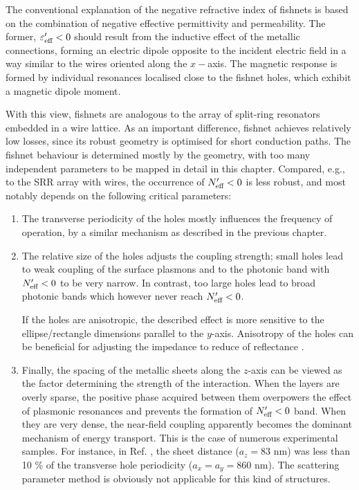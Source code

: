 The conventional explanation of the negative refractive index of fishnets is based on the combination of negative effective permittivity and permeability. The former, $\varepsilon_{\text{eff} }'<0$ should result from the inductive effect of the metallic connections, forming an electric dipole opposite to the incident electric field in a way similar to the wires oriented along the $x-$axis. The magnetic response is formed by individual resonances localised close to the fishnet holes, which exhibit a magnetic dipole moment.

With this view, fishnets are analogous to the array of split-ring resonators embedded in a wire lattice. As an important difference, fishnet achieves relatively low losses, since its robust geometry is optimised for short conduction paths.
The fishnet behaviour is determined mostly by the geometry, with too many independent parameters to be mapped in detail in this chapter. Compared, e.g., to the SRR array with wires, the occurrence of $N_{\text{eff} }'<0$ is less robust, and most notably depends on the following critical parameters:
\begin{enumerate}
\item{The transverse periodicity of the holes mostly influences the frequency of operation, by a similar mechanism as described in the previous chapter.} 
\item{The relative size of the holes adjusts the coupling strength; small holes lead to weak coupling of the surface plasmons and to the photonic band with $N_{\text{eff} }'<0$ to be very narrow. In contrast, too large holes lead to broad photonic bands which however never reach $N_{\text{eff} }'<0$. 
	
If the holes are anisotropic, the described effect is more sensitive to the ellipse/rectangle dimensions parallel to the $y$-axis. Anisotropy of the holes can be beneficial for adjusting the impedance to reduce of reflectance \cite{croenne2009left}.} 
\item{Finally, the spacing of the metallic sheets along the $z$-axis can be viewed as the factor determining the strength of the interaction. When the layers are overly sparse, the positive phase acquired between them overpowers the effect of plasmonic resonances and prevents the formation of $N_{\text{eff} }'< 0$ band. When they are very dense, the near-field coupling apparently becomes the dominant mechanism of energy transport. This is the case of numerous experimental samples. For instance, in Ref. \cite{valentine2011development}, the sheet distance ($a_z = 83$ nm) was less than 10 \% of the transverse hole periodicity ($a_x = a_y = 860$ nm). The scattering parameter method is obviously not applicable for this kind of structures.}
\end{enumerate}

